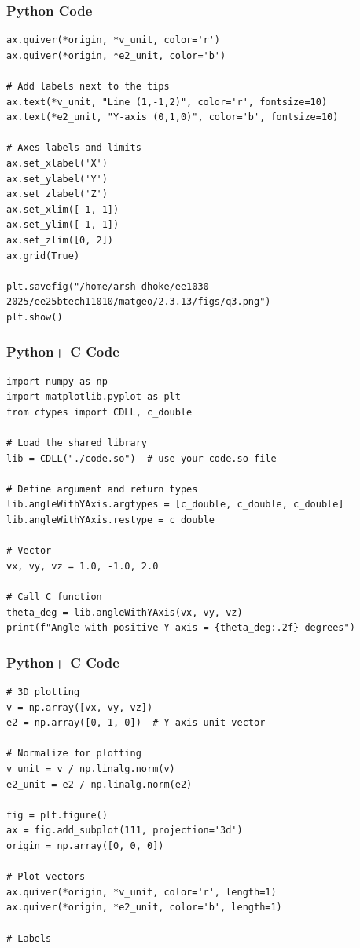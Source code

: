 \documentclass{beamer}
\begin{document}
\begin{frame}[fragile]
    \frametitle{Python Code}
\begin{lstlisting}
ax.quiver(*origin, *v_unit, color='r')
ax.quiver(*origin, *e2_unit, color='b')

# Add labels next to the tips
ax.text(*v_unit, "Line (1,-1,2)", color='r', fontsize=10)
ax.text(*e2_unit, "Y-axis (0,1,0)", color='b', fontsize=10)

# Axes labels and limits
ax.set_xlabel('X')
ax.set_ylabel('Y')
ax.set_zlabel('Z')
ax.set_xlim([-1, 1])
ax.set_ylim([-1, 1])
ax.set_zlim([0, 2])
ax.grid(True)

plt.savefig("/home/arsh-dhoke/ee1030-2025/ee25btech11010/matgeo/2.3.13/figs/q3.png")
plt.show()

\end{lstlisting}
\end{frame}

\begin{frame}[fragile]
    \frametitle{Python+ C Code}
\begin{lstlisting}
import numpy as np
import matplotlib.pyplot as plt
from ctypes import CDLL, c_double

# Load the shared library
lib = CDLL("./code.so")  # use your code.so file

# Define argument and return types
lib.angleWithYAxis.argtypes = [c_double, c_double, c_double]
lib.angleWithYAxis.restype = c_double

# Vector
vx, vy, vz = 1.0, -1.0, 2.0

# Call C function
theta_deg = lib.angleWithYAxis(vx, vy, vz)
print(f"Angle with positive Y-axis = {theta_deg:.2f} degrees")

\end{lstlisting}
\end{frame}

\begin{frame}[fragile]
    \frametitle{Python+ C Code}
\begin{lstlisting}
# 3D plotting
v = np.array([vx, vy, vz])
e2 = np.array([0, 1, 0])  # Y-axis unit vector

# Normalize for plotting
v_unit = v / np.linalg.norm(v)
e2_unit = e2 / np.linalg.norm(e2)

fig = plt.figure()
ax = fig.add_subplot(111, projection='3d')
origin = np.array([0, 0, 0])

# Plot vectors
ax.quiver(*origin, *v_unit, color='r', length=1)
ax.quiver(*origin, *e2_unit, color='b', length=1)

# Labels
\end{lstlisting}
\end{frame}
\end{document}
